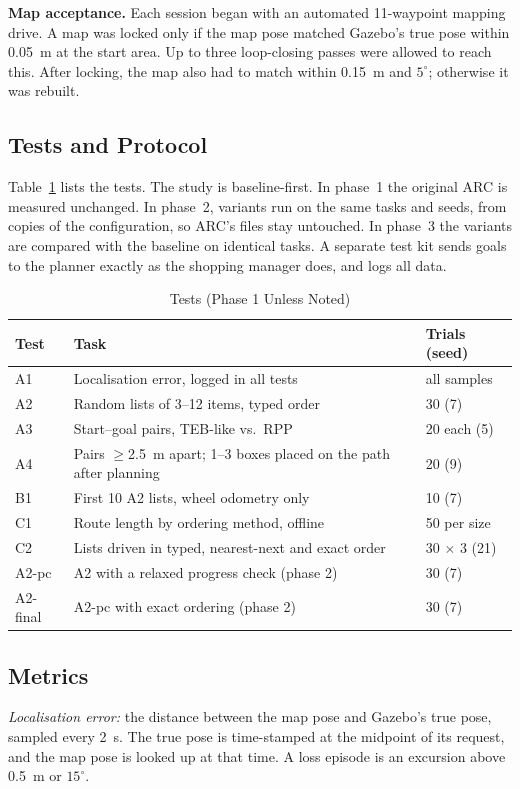 \documentclass[conference]{IEEEtran}
\begin{document}
\textbf{Map acceptance.} Each session began with an automated 11-waypoint mapping drive. A map was locked only if the map pose matched Gazebo's true pose within 0.05~m at the start area. Up to three loop-closing passes were allowed to reach this. After locking, the map also had to match within 0.15~m and $5^\circ$; otherwise it was rebuilt.

\subsection{Tests and Protocol}
Table~\ref{tab:tests} lists the tests. The study is baseline-first. In phase~1 the original ARC is measured unchanged. In phase~2, variants run on the same tasks and seeds, from copies of the configuration, so ARC's files stay untouched. In phase~3 the variants are compared with the baseline on identical tasks. A separate test kit sends goals to the planner exactly as the shopping manager does, and logs all data.

\begin{table}[t]
\caption{Tests (Phase 1 Unless Noted)}
\label{tab:tests}
\centering
\footnotesize
\begin{tabular}{@{}lp{4.6cm}l@{}}
\toprule
Test & Task & Trials (seed) \\
\midrule
A1 & Localisation error, logged in all tests & all samples \\
A2 & Random lists of 3--12 items, typed order & 30 (7) \\
A3 & Start--goal pairs, TEB-like vs.\ RPP \cite{macenski2023} & 20 each (5) \\
A4 & Pairs $\geq$2.5~m apart; 1--3 boxes placed on the path after planning & 20 (9) \\
B1 & First 10 A2 lists, wheel odometry only & 10 (7) \\
C1 & Route length by ordering method, offline & 50 per size \\
C2 & Lists driven in typed, nearest-next and exact order & 30 $\times$ 3 (21) \\
A2-pc & A2 with a relaxed progress check (phase 2) & 30 (7) \\
A2-final & A2-pc with exact ordering (phase 2) & 30 (7) \\
\bottomrule
\end{tabular}
\end{table}

\subsection{Metrics}
\textit{Localisation error:} the distance between the map pose and Gazebo's true pose, sampled every 2~s. The true pose is time-stamped at the midpoint of its request, and the map pose is looked up at that time. A loss episode is an excursion above 0.5~m or $15^\circ$.
\end{document}
